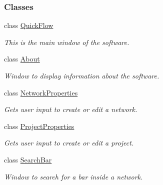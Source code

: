 \subsubsection*{Classes}
\begin{DoxyCompactItemize}
\item 
class \hyperlink{class_quick_flow}{Quick\+Flow}
\begin{DoxyCompactList}\small\item\em This is the main window of the software. \end{DoxyCompactList}\item 
class \hyperlink{class_about}{About}
\begin{DoxyCompactList}\small\item\em Window to display information about the software. \end{DoxyCompactList}\item 
class \hyperlink{class_network_properties}{Network\+Properties}
\begin{DoxyCompactList}\small\item\em Gets user input to create or edit a network. \end{DoxyCompactList}\item 
class \hyperlink{class_project_properties}{Project\+Properties}
\begin{DoxyCompactList}\small\item\em Gets user input to create or edit a project. \end{DoxyCompactList}\item 
class \hyperlink{class_search_bar}{Search\+Bar}
\begin{DoxyCompactList}\small\item\em Window to search for a bar inside a network. \end{DoxyCompactList}\end{DoxyCompactItemize}
